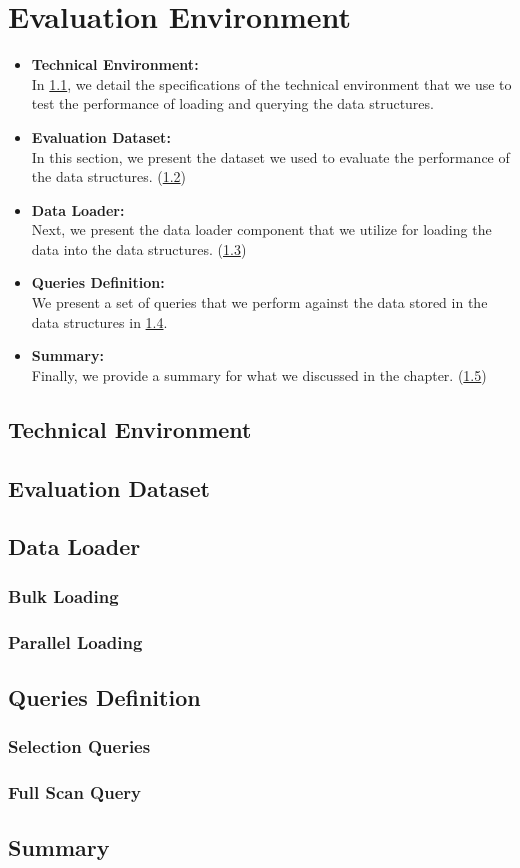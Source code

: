 {\chapter{Evaluation Environment}
\label{chap:Eval_4}

\begin{itemize}  
\item \textbf{Technical Environment:}\\
In \ref{techEnv}, we detail the specifications of the technical environment that we use to test the performance of loading and querying the data structures. 
\item \textbf{Evaluation Dataset:}\\
In this section, we present the dataset we used to evaluate the performance of the data structures. (\ref{dataset})
\item \textbf{Data Loader:}\\
Next, we present the data loader component that we utilize for loading the data into the data structures. (\ref{dataLoader})
\item \textbf{Queries Definition:}\\
We present a set of queries that we perform against the data stored in the data structures in \ref{qryDef}.
\item \textbf{Summary:}\\
Finally, we provide a summary for what we discussed in the chapter. (\ref{Eval:summary})
\end{itemize}


\section{Technical Environment}
\label{techEnv}


\section{Evaluation Dataset}
\label{dataset}


\section{Data Loader}
\label{dataLoader}
\subsection{Bulk Loading}
\subsection{Parallel Loading}


\section{Queries Definition}
\label{qryDef}
\subsection{Selection Queries}
\subsection{Full Scan Query}


\section{Summary}
\label{Eval:summary}

}